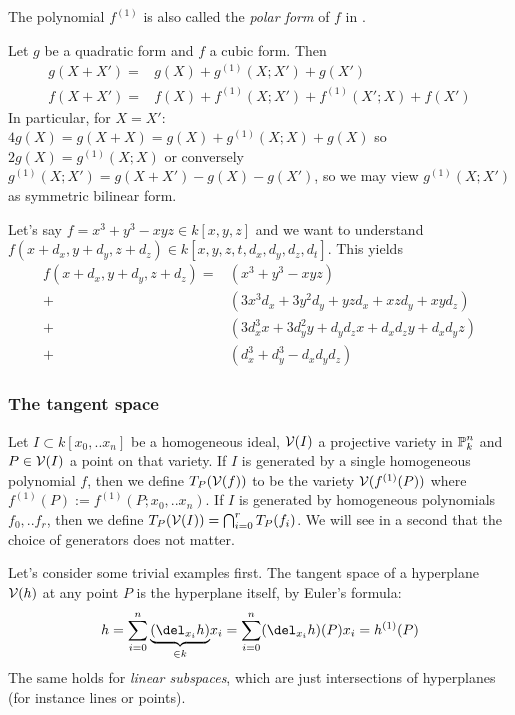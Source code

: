 \begin{remark}
The polynomial $f^{(1)}$ is also called the \emph{polar form} of $f$ in \cite[p. 104]{reid1988undergraduate}.
\end{remark}

\begin{corollary} \label{corollaryTaylorForQuadricAndCubic}
Let $g$ be a quadratic form and $f$ a cubic form. Then
\begin{align}
g(X+X') =& g(X) + g^{(1)}(X;X') + g(X')
\\ f(X+X') =& f(X) + f^{(1)}(X;X') + f^{(1)}(X';X) + f(X')
\end{align}
In particular, for $X=X'$: $4g(X) = g(X+X) = g(X) + g^{(1)}(X;X) + g(X)$ so $2g(X) = g^{(1)}(X;X)$ or conversely $g^{(1)}(X;X') = g(X+X') - g(X) - g(X')$, so we may view $g^{(1)}(X;X')$ as symmetric bilinear form.
\end{corollary}

\begin{example}
Let's say $f = x^3 + y^3 - xyz \in k[x,y,z]$ and we want to understand $f(x+d_x,y+d_y,z+d_z) \in k[x,y,z,t,d_x,d_y,d_z,d_t]$.
This yields
\begin{align*}
f(x+d_x,y+d_y,z+d_z)
  =& (x^3 + y^3 - xyz)
\\+& (3x^3d_x + 3y^2d_y + yzd_x + xzd_y + xyd_z)
\\+& (3d_x^3x + 3d_y^2y + d_yd_zx + d_xd_zy+d_xd_yz)
\\+& (d_x^3 + d_y^3 - d_xd_yd_z)
\end{align*}
\end{example}


\subsubsection{The tangent space}

\begin{definition} \label{definitionTangentSpace}
Let $I \subset k[x_0,..x_n]$ be a homogeneous ideal, $\operatorname{\mathcal V}(I)$ a projective variety in $\operatorname{\mathbb P}^n_k$ and $P\in \operatorname{\mathcal V}(I)$ a point on that variety.
If $I$ is generated by a single homogeneous polynomial $f$, then we define $T_P(\operatorname{\mathcal V}(f))$ to be the variety $\operatorname{\mathcal V}(f^{(1)}(P))$ where $f^{(1)}(P) := f^{(1)}(P;x_0,..x_n)$.
If $I$ is generated by homogeneous polynomials $f_0,..f_r$, then we define $T_P(\operatorname{\mathcal V}(I)) = \bigcap_{i=0}^r T_P(f_i)$.
We will see in a second that the choice of generators does not matter.
\end{definition}

\begin{example} \label{exampleTangentPlaneOfLinearSubsets}
Let's consider some trivial examples first.
The tangent space of a hyperplane $\operatorname{\mathcal V}(h)$ at any point $P$ is the hyperplane itself, by Euler's formula:
\begin{equation}
h = \sum_{i=0}^n \underset{\in k}{\underbrace{(\del_{x_i}h)}}x_i = \sum_{i=0}^n (\del_{x_i}h)(P) x_i = h^{(1)}(P)
\end{equation}
The same holds for \emph{linear subspaces}, which are just intersections of hyperplanes (for instance lines or points).
\end{example}

